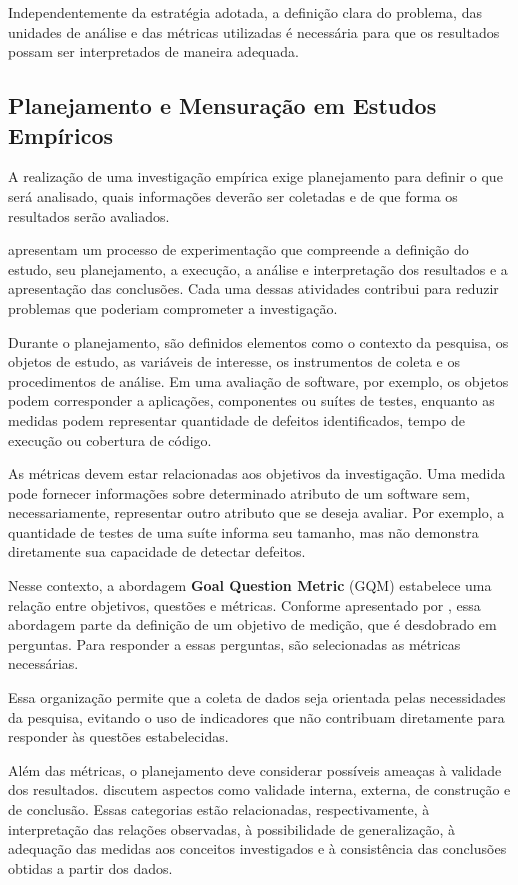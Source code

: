 Independentemente da estratégia adotada, a definição clara do problema, das unidades de análise e das métricas utilizadas é necessária para que os resultados possam ser interpretados de maneira adequada.

\subsection{Planejamento e Mensuração em Estudos Empíricos}

A realização de uma investigação empírica exige planejamento para definir o que será analisado, quais informações deverão ser coletadas e de que forma os resultados serão avaliados.

 apresentam um processo de experimentação que compreende a definição do estudo, seu planejamento, a execução, a análise e interpretação dos resultados e a apresentação das conclusões. Cada uma dessas atividades contribui para reduzir problemas que poderiam comprometer a investigação.

Durante o planejamento, são definidos elementos como o contexto da pesquisa, os objetos de estudo, as variáveis de interesse, os instrumentos de coleta e os procedimentos de análise. Em uma avaliação de software, por exemplo, os objetos podem corresponder a aplicações, componentes ou suítes de testes, enquanto as medidas podem representar quantidade de defeitos identificados, tempo de execução ou cobertura de código.

As métricas devem estar relacionadas aos objetivos da investigação. Uma medida pode fornecer informações sobre determinado atributo de um software sem, necessariamente, representar outro atributo que se deseja avaliar. Por exemplo, a quantidade de testes de uma suíte informa seu tamanho, mas não demonstra diretamente sua capacidade de detectar defeitos.

Nesse contexto, a abordagem \textbf{Goal Question Metric} (GQM) estabelece uma relação entre objetivos, questões e métricas. Conforme apresentado por , essa abordagem parte da definição de um objetivo de medição, que é desdobrado em perguntas. Para responder a essas perguntas, são selecionadas as métricas necessárias.

Essa organização permite que a coleta de dados seja orientada pelas necessidades da pesquisa, evitando o uso de indicadores que não contribuam diretamente para responder às questões estabelecidas.

Além das métricas, o planejamento deve considerar possíveis ameaças à validade dos resultados.  discutem aspectos como validade interna, externa, de construção e de conclusão. Essas categorias estão relacionadas, respectivamente, à interpretação das relações observadas, à possibilidade de generalização, à adequação das medidas aos conceitos investigados e à consistência das conclusões obtidas a partir dos dados.

